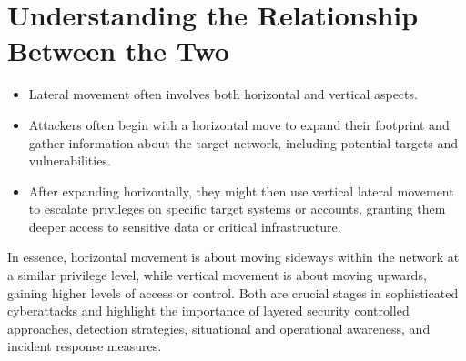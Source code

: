 \begin{itemize}
\begin{itemize}
    \end{itemize}


\section{Understanding the Relationship Between the Two}
\begin{itemize}
    \item Lateral movement often involves both horizontal and vertical aspects.
    \item Attackers often begin with a horizontal move to expand their footprint and gather information about the target network, including potential targets and vulnerabilities.
    \item After expanding horizontally, they might then use vertical lateral movement to escalate privileges on specific target systems or accounts, granting them deeper access to sensitive data or critical infrastructure.

\end{itemize}

In essence, horizontal movement is about moving sideways within the network at a similar privilege level, while vertical movement is about moving upwards, gaining higher levels of access or control. Both are crucial stages in sophisticated cyberattacks and highlight the importance of layered security controlled approaches, detection strategies, situational and operational awareness, and incident response measures.









